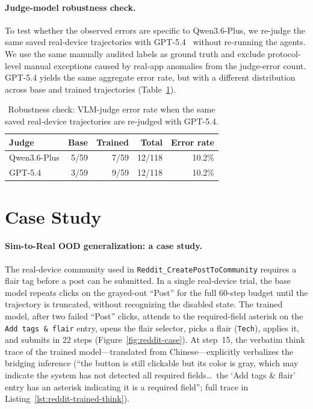 \paragraph{Judge-model robustness check.}
To test whether the observed errors are specific to Qwen3.6-Plus, we re-judge the same saved real-device trajectories with GPT-5.4~\cite{GPT54} without re-running the agents. We use the same manually audited labels as ground truth and exclude protocol-level manual exceptions caused by real-app anomalies from the judge-error count. GPT-5.4 yields the same aggregate error rate, but with a different distribution across base and trained trajectories (Table~\ref{tab:gpt-rejudge}).

\begin{table}[!htbp]
  \centering\small
  \setlength{\tabcolsep}{4pt}
  \begin{tabular}{lrrrr}
    \toprule
    \textbf{Judge} & \textbf{Base} & \textbf{Trained} & \textbf{Total} & \textbf{Error rate} \\
    \midrule
    Qwen3.6-Plus & 5/59 & 7/59 & 12/118 & 10.2\% \\
    GPT-5.4      & 3/59 & 9/59 & 12/118 & 10.2\% \\
    \bottomrule
  \end{tabular}
  \caption{Robustness check: VLM-judge error rate when the same saved real-device trajectories are re-judged with GPT-5.4.}
  \label{tab:gpt-rejudge}
\end{table}


\section{Case Study}\label{app:case-study}

\paragraph{Sim-to-Real OOD generalization: a case study.} The real-device community used in \texttt{Reddit\_CreatePostToCommunity} requires a flair tag before a post can be submitted. In a single real-device trial, the base model repeats clicks on the grayed-out ``Post'' for the full 60-step budget until the trajectory is truncated, without recognizing the disabled state. The trained model, after two failed ``Post'' clicks, attends to the required-field asterisk on the \texttt{Add tags \& flair} entry, opens the flair selector, picks a flair (\texttt{Tech}), applies it, and submits in 22 steps (Figure~\ref{fig:reddit-case}). At step~15, the verbatim think trace of the trained model---translated from Chinese---explicitly verbalizes the bridging inference (``the button is still clickable but its color is gray, which may indicate the system has not detected all required fields\dots\ the `Add tags \& flair' entry has an asterisk indicating it is a required field''; full trace in Listing~\ref{lst:reddit-trained-think}).

